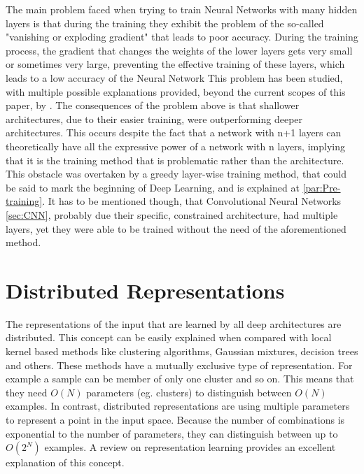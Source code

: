\documentclass[a4paper]{article}
\begin{document}
	The main problem faced when trying to train Neural Networks with many hidden layers is that during the training they exhibit the problem of the so-called "vanishing or exploding gradient" that leads to poor accuracy. During the training process, the gradient that changes the weights of the lower layers gets very small or sometimes very large, preventing the effective training of these layers, which leads to a low accuracy of the Neural Network \cite{Bengio2009} This problem has been studied, with multiple possible explanations provided, beyond the current scopes of this paper, by \cite{Bengio2007}. The consequences of the problem above is that shallower architectures, due to their easier training, were outperforming deeper architectures. This occurs despite the fact that a network with n+1 layers can theoretically have  all the expressive power of a network with n layers, implying that it is the training method that is problematic rather than the architecture. This obstacle was overtaken by a greedy layer-wise training method, that could be said to mark the beginning of Deep Learning, and is explained at \ref{par:Pre-training}. It has to be mentioned though, that Convolutional Neural Networks \ref{sec:CNN}, probably due their specific, constrained architecture, had multiple layers, yet they were able to be trained without the need of the aforementioned method.
\section{Distributed Representations}
	\label{sec:Dist. rep.}
	
		The representations of the input that are learned by all deep architectures are distributed. This concept can be easily explained when compared with local kernel based methods like clustering algorithms, Gaussian mixtures, decision trees and others. These methods have a mutually exclusive type of representation. For example a sample can be  member of only one cluster and so on. This means that they need $O(N)$ parameters (eg. clusters) to distinguish between $O(N)$ examples. In contrast, distributed representations are using multiple parameters to represent a point in the input space. Because the number of combinations is exponential to the number of parameters, they can distinguish between up to $O(2^N)$ examples. A review on representation learning \cite{Bengio2013c} provides an excellent explanation of this concept.
		
\end{document}
